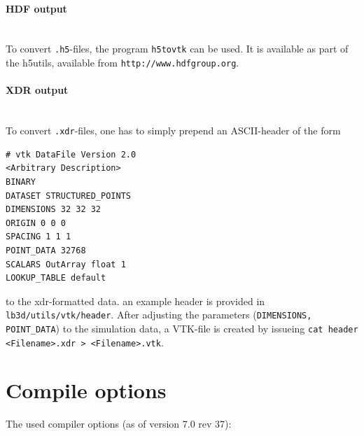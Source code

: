 \documentclass[a4paper]{article}
\begin{document}
\paragraph{HDF output}~\\
To convert {\tt .h5}-files, the program {\tt h5tovtk} can be used. It is available as part of the h5utils, available from {\tt http://www.hdfgroup.org}.

\paragraph{XDR output}~\\
To convert {\tt .xdr}-files, one has to simply prepend an ASCII-header of the form
\begin{verbatim}
# vtk DataFile Version 2.0
<Arbitrary Description>
BINARY
DATASET STRUCTURED_POINTS
DIMENSIONS 32 32 32
ORIGIN 0 0 0
SPACING 1 1 1
POINT_DATA 32768
SCALARS OutArray float 1
LOOKUP_TABLE default
\end{verbatim} 
to the xdr-formatted data. an example header is provided in {\tt lb3d/utils/vtk/header}. After adjusting the parameters ({\tt DIMENSIONS, POINT\_DATA}) to the simulation data, a VTK-file is created by issueing
{\tt cat header <Filename>.xdr > <Filename>.vtk}.
\newpage
\appendix

\section{Compile options}
\label{apx:compileOptions}
The used compiler options (as of version 7.0 rev 37):~\\~\\
\end{document}
